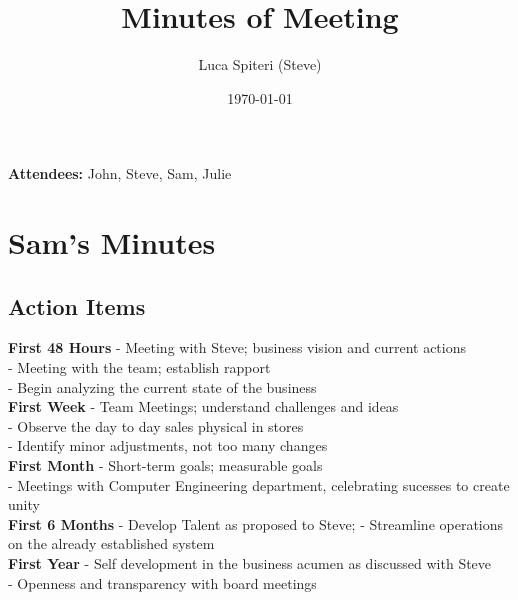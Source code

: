 \documentclass[a4paper,12pt]{article}
\title{Minutes of Meeting}
\date{\today}
\begin{document}
\maketitle

\begingroup
\large
\textbf{Attendees:} John, Steve, Sam, Julie
\endgroup

\section{Sam's Minutes}
\author{Luca Spiteri (Steve)}

\subsection{Action Items}
\textbf{First 48 Hours}
- Meeting with Steve; business vision and current actions \\
- Meeting with the team; establish rapport \\
- Begin analyzing the current state of the business \\

\textbf{First Week}
- Team Meetings; understand challenges and ideas \\
- Observe the day to day sales physical in stores \\
- Identify minor adjustments, not too many changes \\

\textbf{First Month}
- Short-term goals; measurable goals \\
- Meetings with Computer Engineering department, celebrating sucesses to create unity \\

\textbf{First 6 Months}
- Develop Talent as proposed to Steve;
- Streamline operations on the already established system \\

\textbf{First Year}
- Self development in the business acumen as discussed with Steve \\
- Openness and transparency with board meetings \\
\end{document}
